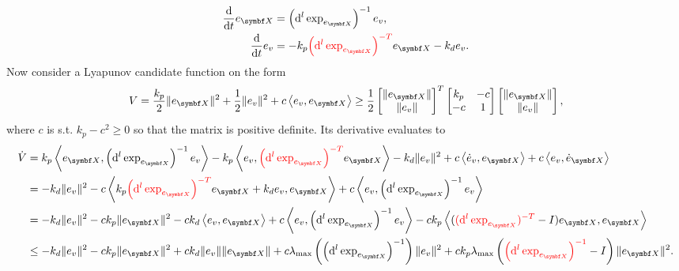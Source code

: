 \begin{equation}
  \begin{aligned}
    \frac{\mathrm{d}}{\mathrm{d}t} e_\X & = \left(\mathrm{d}^l \exp_{e_\X} \right)^{-1} e_v,                                   \\
    \frac{\mathrm{d}}{\mathrm{d}t} e_v  & = -k_p \textcolor{red}{\left( \mathrm{d}^l \exp_{e_\X} \right)^{-T}} e_\X - k_d e_v.
  \end{aligned}
\end{equation}
Now consider a Lyapunov candidate function on the form
\begin{equation}
  V = \frac{k_p}{2} \| e_\X \|^2 + \frac{1}{2} \| e_v \|^2 + c \left \langle e_v, e_\X \right \rangle \geq \frac{1}{2} \begin{bmatrix} \| e_\X \| \\ \| e_v \| \end{bmatrix}^T \begin{bmatrix} k_p & -c \\ -c & 1 \end{bmatrix} \begin{bmatrix} \| e_\X \| \\ \| e_v \| \end{bmatrix},
\end{equation}
where $c$ is s.t. $k_p - c^2 \geq 0$ so that the matrix is positive definite. Its derivative evaluates to
\begin{equation*}
  \begin{aligned}
    \dot V & = k_p \left \langle e_\X, \left( \mathrm{d}^l \exp_{e_\X} \right)^{-1} e_v \right \rangle - k_p \left \langle e_v,  \textcolor{red}{\left( \mathrm{d}^l \exp_{e_\X} \right)^{-T}} e_\X \right \rangle - k_d \| e_v \|^2 + c \left \langle \dot e_v, e_\X \right \rangle + c \left \langle e_v, \dot e_\X \right \rangle \\
           & = - k_d \| e_v \|^2 - c \left \langle k_p \textcolor{red}{\left( \mathrm{d}^l \exp_{e_\X} \right)^{-T}} e_\X + k_d e_v, e_\X \right \rangle + c \left \langle e_v, \left(\mathrm{d}^l \exp_{e_\X} \right)^{-1} e_v \right \rangle                                                                                       \\
           & = -k_d \| e_v \|^2 - c k_p \| e_\X \|^2 - c k_d \left \langle e_v, e_\X \right \rangle + c \left \langle e_v, \left(\mathrm{d}^l \exp_{e_\X} \right)^{-1} e_v \right \rangle - c k_p \left \langle ( \textcolor{red}{(\mathrm{d}^l \exp_{e_\X})^{-T}} - I) e_\X , e_\X \right \rangle                                   \\
           & \leq -k_d \| e_v \|^2 - c k_p \| e_\X \|^2 + c k_d \| e_v \| \| e_\X \| + c \lambda_{\textrm{max}}\left( \left( \mathrm{d}^l \exp_{e_\X} \right)^{-1} \right) \| e_v \|^2 + c k_p \lambda_{\textrm{max}} \left( \textcolor{red}{\left(\mathrm{d}^l \exp_{e_\X} \right)^{-1}} - I \right) \| e_\X \|^2.
  \end{aligned}
\end{equation*}

